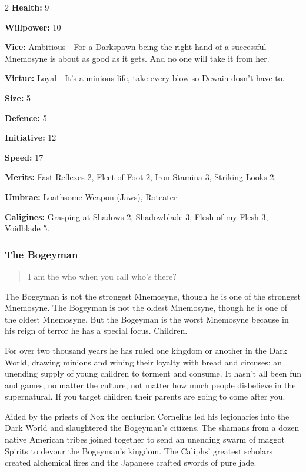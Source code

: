 \begin{multicols}{2}
\noindent \textbf{Health:} 9

\noindent \textbf{Willpower:} 10

\noindent \textbf{Vice:} Ambitious - For a Darkspawn being the right hand of a successful Mnemosyne is about as good as it gets. And no one will take it from her.

\noindent \textbf{Virtue:} Loyal - It's a minions life, take every blow so Dewain dosn't have to.

\noindent \textbf{Size:} 5

\noindent \textbf{Defence:} 5

\noindent \textbf{Initiative:} 12

\noindent \textbf{Speed:} 17

\noindent \textbf{Merits:} Fast Reflexes 2, Fleet of Foot 2, Iron Stamina 3, Striking Looks 2.

\noindent \textbf{Umbrae:} Loathsome Weapon (Jaws), Roteater

\noindent \textbf{Caligines:} Grasping at Shadows 2, Shadowblade 3,  Flesh of my Flesh 3, Voidblade 5.

\subsubsection*{The Bogeyman}

\begin{quote}I am the who when you call who's there?\end{quote}

The Bogeyman is not the strongest Mnemosyne, though he is one of the strongest Mnemosyne. The Bogeyman is not the oldest Mnemosyne, though he is one of the oldest Mnemosyne. But the Bogeyman is the worst Mnemosyne because in his reign of terror he has a special focus. Children.

For over two thousand years he has ruled one kingdom or another in the Dark World, drawing minions and wining their loyalty with bread and circuses: an unending supply of young children to torment and consume. It hasn't all been fun and games, no matter the culture, not matter how much people disbelieve in the supernatural. If you target children their parents are going to come after you.

Aided by the priests of Nox the centurion Cornelius led his legionaries into the Dark World and slaughtered the Bogeyman's citizens. The shamans from a dozen native American tribes joined together to send an unending swarm of maggot Spirits to devour the Bogeyman's kingdom. The Caliphs' greatest scholars created alchemical fires and the Japanese crafted swords of pure jade.


\end{multicols}
